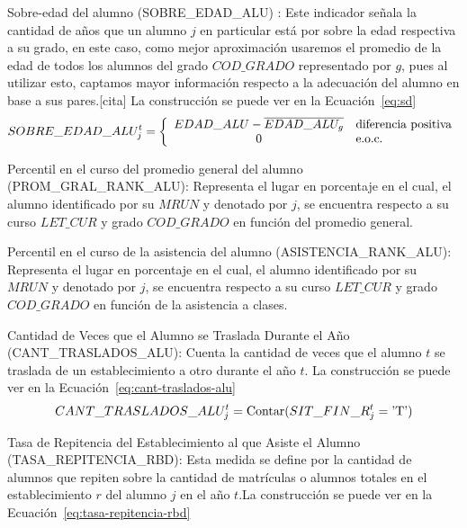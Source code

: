 \begin{longdescription}
\begin{longdescription}
              \item[Sobre-edad del alumno] (SOBRE\_EDAD\_ALU) : Este indicador señala la cantidad de años que un alumno $j$ en particular está por sobre la edad respectiva a su grado, en este caso, como mejor aproximación usaremos el promedio de la edad de todos los alumnos del grado $COD\_GRADO$ representado por $g$, pues al utilizar esto, captamos mayor información respecto a la adecuación del alumno en base a sus pares.[cita] La construcción se puede ver en la Ecuación~\ref{eq:sd}
              \begin{equation}
              \centering
              SOBRE\_EDAD\_ALU_{j}^{t} = \left\{
                \begin{array}{c l}
                 EDAD\_ALU -\overline{EDAD\_ALU_g} & \mbox{diferencia positiva}\\
                 0 & \mbox{e.o.c.}
                \end{array}
                \right.
                \label{eq:sd}
              \end{equation}
              \item[Percentil en el curso del promedio general del alumno] (PROM\_GRAL\_RANK\_ALU): Representa el lugar en porcentaje en el cual, el alumno identificado por su $MRUN$ y denotado por $j$, se encuentra respecto a su curso $LET\_CUR$ y grado $COD\_GRADO$ en función del promedio general.
              \item[Percentil en el curso de la asistencia del alumno](ASISTENCIA\_RANK\_ALU): Representa el lugar en porcentaje en el cual, el alumno identificado por su $MRUN$ y denotado por $j$, se encuentra respecto a su curso $LET\_CUR$ y grado $COD\_GRADO$ en función de la asistencia a clases.
              \item[Cantidad de Veces que el Alumno se Traslada Durante el Año](CANT\_TRASLADOS\_ALU):
             Cuenta la cantidad de veces que el alumno $t$ se traslada de un establecimiento a otro durante el año $t$. La construcción se puede ver en la Ecuación~\ref{eq:cant-traslados-alu}
            \begin{equation}
              \centering
              CANT\_TRASLADOS\_ALU_{j}^{t} = \mbox{Contar}(SIT\_FIN\_R_{j}^{t} = \mbox{'T'})
                \label{eq:cant-traslados-alu}
              \end{equation}
              \item[Tasa de Repitencia del Establecimiento al que Asiste el Alumno](TASA\_REPITENCIA\_RBD): Esta medida se define por la cantidad de alumnos que repiten sobre la cantidad de matrículas o alumnos totales en el establecimiento $r$ del alumno $j$ en el año $t$.La construcción se puede ver en la Ecuación~\ref{eq:tasa-repitencia-rbd}

\end{longdescription}
\end{longdescription}

